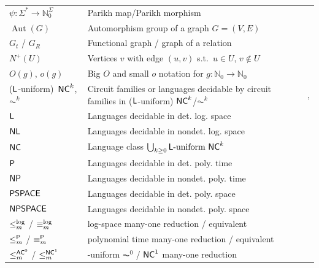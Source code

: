 \begin{longtable}{p{} p{} p{}}
	$\psi\colon \Sigma^* \to \mathbb N_0^{\Sigma}$ & Parikh map/Parikh morphism & \pageref{def:Parikhmap} \\
	$\operatorname{Aut}(G)$ & Automorphism group of a graph $G = (V,E)$ & \pageref{def:AutG} \\
	$G_t$ / $G_R$ & Functional graph / graph of a relation & \pageref{def:Gf} \\ %
	$N^+(U)$      & Vertices $v$ with edge $(u,v)$ s.t.~$u \in U$, $v \notin U$ & \pageref{def:Nplus} \\
	$O(g)$, $o(g)$  & Big $O$ and small $o$ notation for $g \colon \mathbb N_0 \to \mathbb N_0$ & \pageref{def:bigO} \\
	($\textsf{L}$-uniform)~$\textup{\textsf{NC}}^k$, $\AC^k$                  
	& Circuit families or 
	languages decidable by circuit families in ($\textsf{L}$-uniform) $\textup{\textsf{NC}}^k$/$\AC^k$  &  \pageref{def:AC0circuitclass}, \pageref{def:ACkNCk} \\
	$\textsf{L}$  & Languages decidable in det. log. space & \pageref{def:L}  \\
	$\textup{\textsf{NL}}$        & Languages decidable in nondet. log. space & \pageref{def:NL} 		\\ 
	$\textup{\textsf{NC}}$ & Language class $\bigcup_{k\ge 0} \text{\LOGSPACE-uniform } \NC^k$  &  \pageref{def:NC} \\
	$\textup{\textsf{P}}$     & Languages decidable in det. poly. time & \pageref{def:P} \\
	$\textup{\textsf{NP}}$        & Languages decidable in nondet. poly. time & \pageref{def:NP}  \\
	$\textup{\textsf{PSPACE}}$    & Languages decidable in det. poly. space & \pageref{def:PSPACE} \\
	$\textup{\textsf{NPSPACE}}$   & Languages decidable in nondet. poly. space & \pageref{def:NPSPACE}  \\
	$\le_m^{\log}$ / $\equiv_m^{\log}$   & log-space many-one reduction / equivalent& \pageref{def:lelogm} \\
	$\le_m^{\textup{\textsf{P}}}$ / $\equiv_m^{\textup{\textsf{P}}}$      & polynomial time many-one reduction / equivalent & \pageref{def:lePm} \\
	$\le_m^{\textup{\textsf{AC}}^{0}}$ / $\le_m^{\textup{\textsf{NC}}^{1}}$ & \LOGSPACE-uniform $\AC^0$ / $\textup{\textsf{NC}}^1$ many-one reduction & \pageref{def:leACZEROm} \\ 

\end{longtable}
